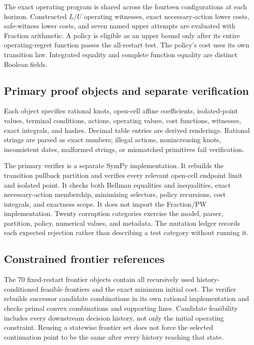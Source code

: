 The exact operating program is shared across the fourteen configurations at each horizon. Constructed $L/U$ operating witnesses, exact necessary-action lower costs, safe-witness lower costs, and seven named upper attempts are evaluated with Fraction arithmetic. A policy is eligible as an upper bound only after its entire operating-regret function passes the all-restart test. The policy's cost uses its own transition law. Integrated equality and complete function equality are distinct Boolean fields.

\subsection{Primary proof objects and separate verification}
Each  object specifies rational knots, open-cell affine coefficients, isolated-point values, terminal conditions, actions, operating values, cost functions, witnesses, exact integrals, and hashes. Decimal table entries are derived renderings. Rational strings are parsed as exact numbers; illegal actions, nonincreasing knots, inconsistent dates, malformed strings, or mismatched primitives fail verification.

The primary verifier is a separate SymPy implementation. It rebuilds the transition pullback partition and verifies every relevant open-cell endpoint limit and isolated point. It checks both Bellman equalities and inequalities, exact necessary-action membership, minimizing selectors, policy recursions, cost integrals, and exactness scope. It does not import the Fraction/PW implementation. Twenty corruption categories exercise the model, parser, partition, policy, numerical values, and metadata. The mutation ledger records each expected rejection rather than describing a test category without running it.

\subsection{Constrained frontier references}
The 70 fixed-restart frontier objects contain all recursively used history-conditioned feasible frontiers and the exact minimum initial cost. The verifier rebuilds successor candidate combinations in its own rational implementation and checks primal convex combinations and supporting lines. Candidate feasibility includes every downstream decision history, not only the initial operating constraint. Reusing a statewise frontier set does not force the selected continuation point to be the same after every history reaching that state.

